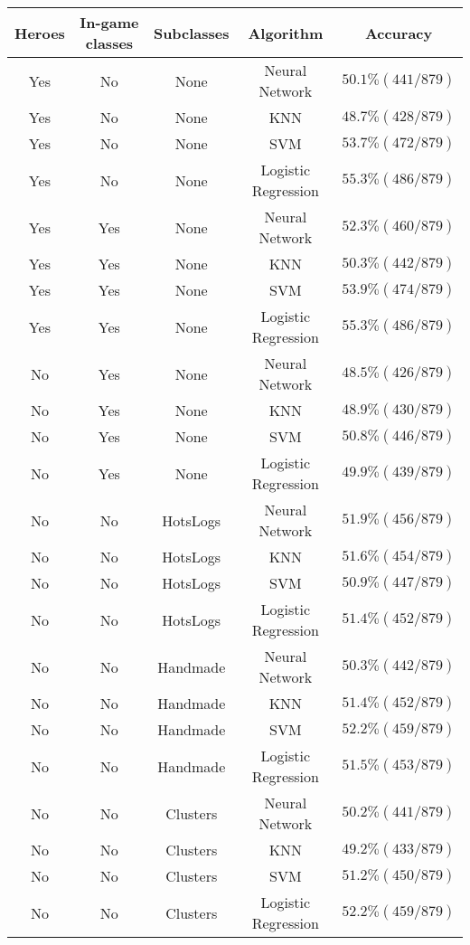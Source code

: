 \documentclass[11pt,letterpaper]{article}
\begin{document}
\begin{tabular}{c|c|c|c|c}
\textbf{Heroes} & \textbf{In-game classes} & \textbf{Subclasses} & \textbf{Algorithm} & \textbf{Accuracy} \\
\hline
Yes & No & None & Neural Network & $50.1\% (441/879)$ \\
Yes & No & None & KNN & $48.7\% (428/879)$ \\
Yes & No & None & SVM & $53.7\% (472/879)$ \\
Yes & No & None & Logistic Regression & $55.3\% (486/879)$ \\

Yes & Yes & None & Neural Network & $52.3\% (460/879)$ \\
Yes & Yes & None & KNN & $50.3\% (442/879)$ \\
Yes & Yes & None & SVM & $53.9\% (474/879)$ \\
Yes & Yes & None & Logistic Regression & $55.3\% (486/879)$ \\

No & Yes & None & Neural Network & $48.5\% (426/879)$ \\
No & Yes & None & KNN & $48.9\% (430/879)$ \\
No & Yes & None & SVM & $50.8\% (446/879)$ \\
No & Yes & None & Logistic Regression & $49.9\% (439/879)$ \\

No & No & HotsLogs & Neural Network & $51.9\% (456/879)$ \\
No & No & HotsLogs & KNN & $51.6\% (454/879)$ \\
No & No & HotsLogs & SVM & $50.9\% (447/879)$ \\
No & No & HotsLogs & Logistic Regression & $51.4\% (452/879)$ \\

No & No & Handmade & Neural Network & $50.3\% (442/879)$ \\
No & No & Handmade & KNN & $51.4\% (452/879)$ \\
No & No & Handmade & SVM & $52.2\% (459/879)$ \\
No & No & Handmade & Logistic Regression & $51.5\% (453/879)$ \\

No & No & Clusters & Neural Network & $50.2\% (441/879)$ \\
No & No & Clusters & KNN & $49.2\% (433/879)$ \\
No & No & Clusters & SVM & $51.2\% (450/879)$ \\
No & No & Clusters & Logistic Regression & $52.2\% (459/879)$ \\
\end{tabular}
\end{document}
